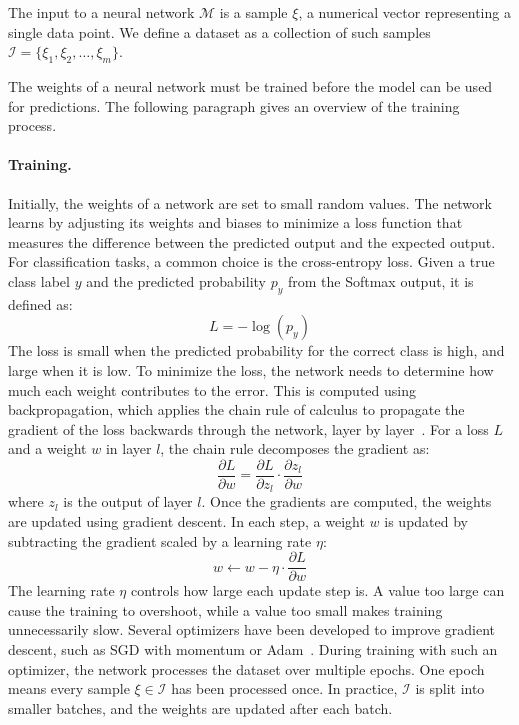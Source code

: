 \documentclass[
12pt,
fancyheadings,
a4paper,
twoside,
BCOR=0.7cm,
nobcorignoretitle,
grayscalebody,
]{stsreprt}
\begin{document}
The input to a neural network $\mathcal{M}$ is a sample $\xi$, a numerical vector representing a
single data point. We define a dataset as a collection of such samples $\mathcal{I} = \{\xi_1,
\xi_2, \dots, \xi_m\}$.

The weights of a neural network must be trained before the model can be used for predictions. The
following paragraph gives an overview of the training process.

\paragraph{Training.}
Initially, the weights of a network are set to small random values.
The network learns by adjusting its weights and biases to minimize a loss function that measures
the difference between the predicted output and the expected output.
For classification tasks, a common choice is the cross-entropy loss.
Given a true class label $y$ and the predicted probability $p_y$ from the Softmax output, it is
defined as:
\begin{equation}
        L = -\log(p_y)
\end{equation}
The loss is small when the predicted probability for the correct class is high, and large when it
is low.
To minimize the loss, the network needs to determine how much each weight contributes to the error.
This is computed using backpropagation, which applies the chain rule of calculus to propagate the
gradient of the loss backwards through the network, layer by layer~\cite{rumelhart1986learning}.
For a loss $L$ and a weight $w$ in layer $l$, the chain rule decomposes the gradient as:
\begin{equation}
    \frac{\partial L}{\partial w} = \frac{\partial L}{\partial z_l} \cdot \frac{\partial z_l}{\partial w}
\end{equation}
where $z_l$ is the output of layer $l$.
Once the gradients are computed, the weights are updated using gradient descent.
In each step, a weight $w$ is updated by subtracting the gradient scaled by a learning rate $\eta$:
\begin{equation}
        w \leftarrow w - \eta \cdot \frac{\partial L}{\partial w}
\end{equation}
The learning rate $\eta$ controls how large each update step is. A value too large can cause the
training to overshoot, while a value too small makes training unnecessarily slow.
Several optimizers have been developed to improve gradient descent, such as SGD with momentum or
Adam~\cite{qian1999momentum, kingma2015adam}.
During training with such an optimizer, the network processes the dataset over multiple epochs. One
epoch means every sample $\xi \in \mathcal{I}$ has been processed once.
In practice, $\mathcal{I}$ is split into smaller batches, and the weights are updated after each
batch.
\end{document}
